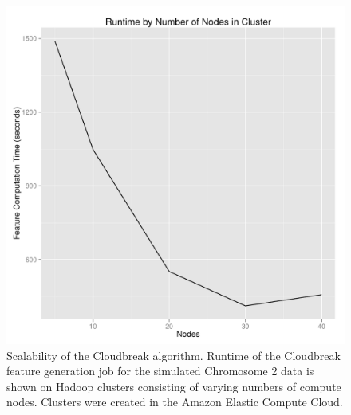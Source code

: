 \documentclass[11pt]{article}
\begin{document}
\begin{figure}
\centering
\includegraphics[width=1\textwidth]{../../figures/runtimeByNodes.pdf}
\caption{Scalability of the Cloudbreak algorithm. Runtime of the Cloudbreak feature generation job for the simulated Chromosome 2 data is shown on Hadoop clusters consisting of varying numbers of compute nodes. Clusters were created in the Amazon Elastic Compute Cloud.}
\label{scalability}
\end{figure}

\clearpage
\end{document}
